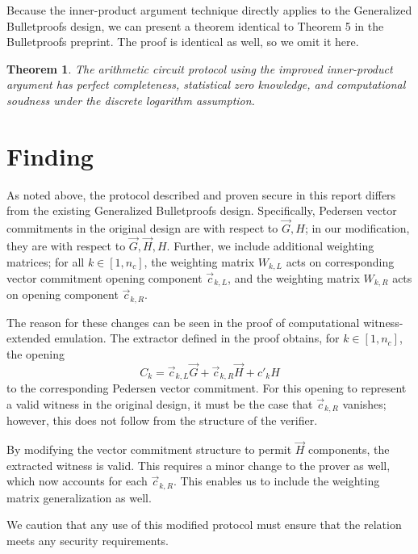\documentclass{article}
\newtheorem*{theorem}{Theorem}
\begin{document}
Because the inner-product argument technique directly applies to the Generalized Bulletproofs design, we can present a theorem identical to Theorem 5 in the Bulletproofs preprint.
The proof is identical as well, so we omit it here.

\begin{theorem}
	The arithmetic circuit protocol using the improved inner-product argument has perfect completeness, statistical zero knowledge, and computational soudness under the discrete logarithm assumption.
\end{theorem}


\section{Finding}

As noted above, the protocol described and proven secure in this report differs from the existing Generalized Bulletproofs design.
Specifically, Pedersen vector commitments in the original design are with respect to $\vec{G}, H$; in our modification, they are with respect to $\vec{G}, \vec{H}, H$.
Further, we include additional weighting matrices; for all $k \in [1, n_c]$, the weighting matrix $W_{k,L}$ acts on corresponding vector commitment opening component $\vec{c}_{k,L}$, and the weighting matrix $W_{k,R}$ acts on opening component $\vec{c}_{k,R}$.

The reason for these changes can be seen in the proof of computational witness-extended emulation.
The extractor defined in the proof obtains, for $k \in [1, n_c]$, the opening
$$C_k = \vec{c}_{k,L} \vec{G} + \vec{c}_{k,R} \vec{H} + c'_k H$$
to the corresponding Pedersen vector commitment.
For this opening to represent a valid witness in the original design, it must be the case that $\vec{c}_{k,R}$ vanishes; however, this does not follow from the structure of the verifier.

By modifying the vector commitment structure to permit $\vec{H}$ components, the extracted witness is valid.
This requires a minor change to the prover as well, which now accounts for each $\vec{c}_{k,R}$.
This enables us to include the weighting matrix generalization as well.

We caution that any use of this modified protocol must ensure that the relation meets any security requirements.




\end{document}
